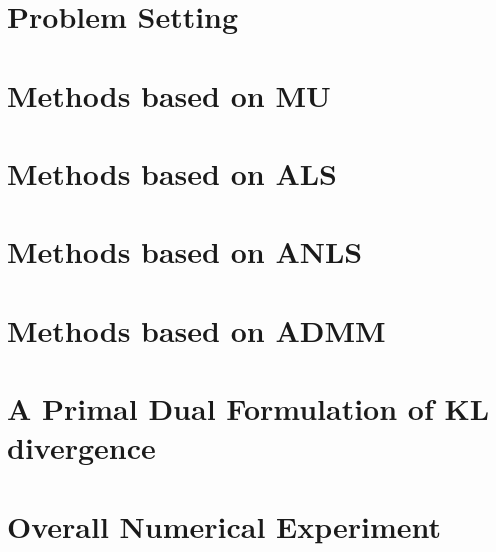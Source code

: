 \documentclass{article}
\begin{document}
	\maketitle
	\thispagestyle{fancy}
	\tableofcontents
	
	\section*{}



\section{Problem Setting}


\section{Methods based on MU}

\section{Methods based on ALS}


\section{Methods based on ANLS}

\section{Methods based on ADMM}

\section{A Primal Dual Formulation of KL divergence}

\section{Overall Numerical Experiment}
\end{document}
